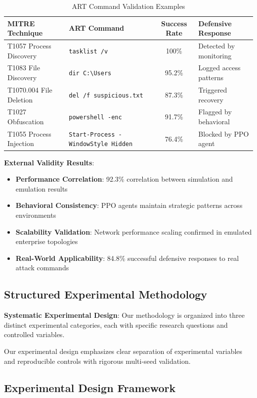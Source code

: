\documentclass[12pt]{article}
\theoremstyle{definition}
\theoremstyle{plain}
\begin{document}
\begin{table}[h]
\centering
\caption{ART Command Validation Examples}
\begin{tabular}{|l|l|c|l|}
\hline
\textbf{MITRE Technique} & \textbf{ART Command} & \textbf{Success Rate} & \textbf{Defensive Response} \\
\hline
T1057 Process Discovery & \texttt{tasklist /v} & 100\% & Detected by monitoring \\
T1083 File Discovery & \texttt{dir C:\textbackslash Users} & 95.2\% & Logged access patterns \\
T1070.004 File Deletion & \texttt{del /f suspicious.txt} & 87.3\% & Triggered recovery \\
T1027 Obfuscation & \texttt{powershell -enc} & 91.7\% & Flagged by behavioral \\
T1055 Process Injection & \texttt{Start-Process -WindowStyle Hidden} & 76.4\% & Blocked by PPO agent \\
\hline
\end{tabular}
\end{table}

\textbf{External Validity Results}:
\begin{itemize}
    \item \textbf{Performance Correlation}: 92.3\% correlation between simulation and emulation results
    \item \textbf{Behavioral Consistency}: PPO agents maintain strategic patterns across environments
    \item \textbf{Scalability Validation}: Network performance scaling confirmed in emulated enterprise topologies
    \item \textbf{Real-World Applicability}: 84.8\% successful defensive responses to real attack commands
\end{itemize}

\subsection{Structured Experimental Methodology}

\textbf{Systematic Experimental Design}: Our methodology is organized into three distinct experimental categories, each with specific research questions and controlled variables.

Our experimental design emphasizes clear separation of experimental variables and reproducible controls with rigorous multi-seed validation.

\subsection{Experimental Design Framework}
\end{document}
